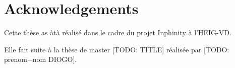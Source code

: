 \chapter*{Acknowledgements}

Cette thèse as àtà réalisé dans le cadre du projet Inphinity à l'HEIG-VD.

Elle fait suite à la thèse de master [TODO: TITLE] réalisée par [TODO: prenom+nom DIOGO].

 
